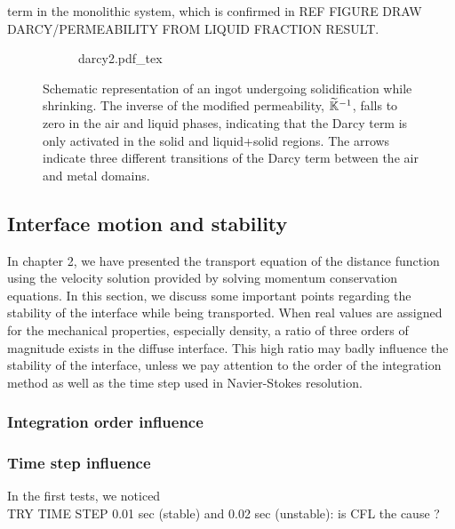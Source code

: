 term in the monolithic system, which is confirmed in REF FIGURE DRAW DARCY/PERMEABILITY FROM LIQUID FRACTION RESULT.
\begin{figure}[htbp]
\centering
  \begin{subfigure}{1.0\textwidth}
    \centering
    \def\svgwidth{250pt}
	{darcy2.pdf_tex}
  \end{subfigure}
\caption{Schematic representation of an ingot undergoing solidification while shrinking. 
The inverse of the modified permeability, $\widetilde{\mathbb{K}}^{-1}$, falls to zero in the air and liquid phases,
indicating that the Darcy term is only activated in the solid and liquid+solid regions.
The arrows indicate three different transitions of the Darcy term between the air and metal domains.}
\label{fig:darcy_modif}
\end{figure}
\subsection{Interface motion and stability}

In chapter 2, we have presented the transport equation of the distance function using the velocity solution 
provided by solving momentum conservation equations. In this section, we discuss some important points regarding the stability
of the interface while being transported. When real values are assigned for the mechanical properties, especially density,
a ratio of three orders of magnitude exists in the diffuse interface. This high ratio may badly influence the stability
of the interface, unless we pay attention to the order of the integration method as well as the time step used in Navier-Stokes
resolution.

\subsubsection{Integration order influence}
\subsubsection{Time step influence}
In the first tests, we noticed \\
TRY TIME STEP 0.01 sec (stable) and 0.02 sec (unstable): is CFL the cause ?
